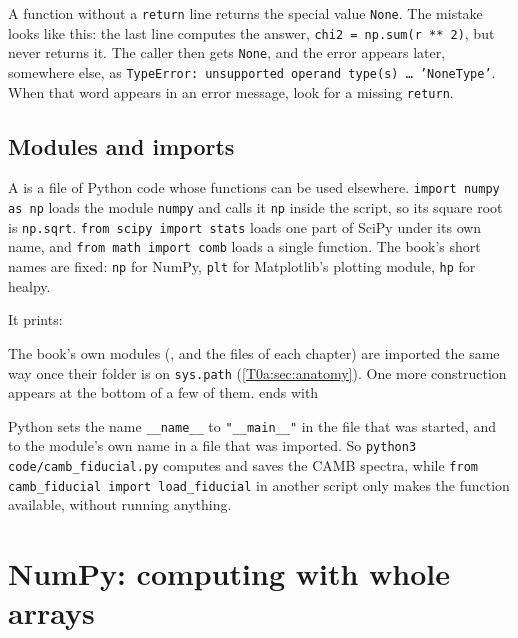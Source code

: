 \begin{pitfall}
A function without a \texttt{return} line returns the special value \texttt{None}. The mistake looks like this: the last line computes the answer, \texttt{chi2 = np.sum(r ** 2)}, but never returns it. The caller then gets \texttt{None}, and the error appears later, somewhere else, as \texttt{TypeError: unsupported operand type(s) \dots{} 'NoneType'}. When that word appears in an error message, look for a missing \texttt{return}.
\end{pitfall}

\subsection{Modules and imports}
\label{T0a:sec:imports}

A  is a file of Python code whose functions can be used elsewhere. \texttt{import numpy as np} loads the module \texttt{numpy} and calls it \texttt{np} inside the script, so its square root is \texttt{np.sqrt}. \texttt{from scipy import stats} loads one part of SciPy under its own name, and \texttt{from math import comb} loads a single function. The book's short names are fixed: \texttt{np} for NumPy, \texttt{plt} for Matplotlib's plotting module, \texttt{hp} for healpy.

\noindent It prints:

The book's own modules (,  and the  files of each chapter) are imported the same way once their folder is on \texttt{sys.path} (\cref{T0a:sec:anatomy}). One more construction appears at the bottom of a few of them.  ends with


Python sets the name \texttt{\_\_name\_\_} to \texttt{"\_\_main\_\_"} in the file that was started, and to the module's own name in a file that was imported. So \texttt{python3 code/camb\_fiducial.py} computes and saves the CAMB spectra, while \texttt{from camb\_fiducial import load\_fiducial} in another script only makes the function available, without running anything.
\section{NumPy: computing with whole arrays}
\label{T0a:sec:numpy}

